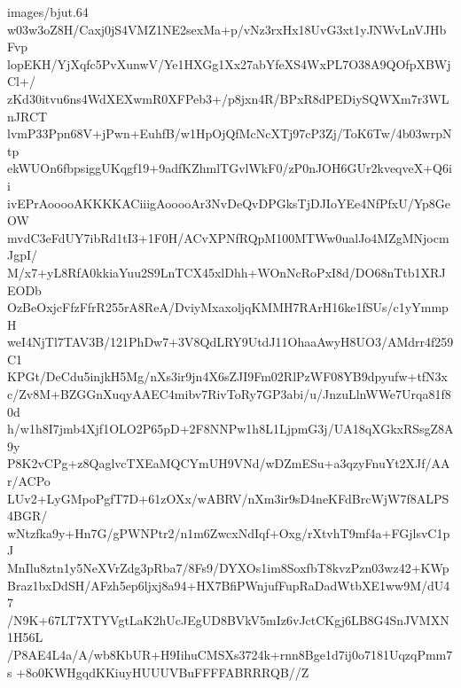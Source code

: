 \begin{filecontents*}{images/bjut.64}
w03w3oZ8H/Caxj0jS4VMZ1NE2sexMa+p/vNz3rxHx18UvG3xt1yJNWvLnVJHbFvp
lopEKH/YjXqfc5PvXunwV/Ye1HXGg1Xx27abYfeXS4WxPL7O38A9QOfpXBWjCl+/
zKd30itvu6ns4WdXEXwmR0XFPeb3+/p8jxn4R/BPxR8dPEDiySQWXm7r3WLnJRCT
lvmP33Ppn68V+jPwn+EuhfB/w1HpOjQfMcNcXTj97cP3Zj/ToK6Tw/4b03wrpNtp
ekWUOn6fbpsiggUKqgf19+9adfKZhmlTGvlWkF0/zP0nJOH6GUr2kveqveX+Q6ii
ivEPrAooooAKKKKACiiigAooooAr3NvDeQvDPGksTjDJIoYEe4NfPfxU/Yp8GeOW
mvdC3eFdUY7ibRd1tI3+1F0H/ACvXPNfRQpM100MTWw0ualJo4MZgMNjocmJgpI/
M/x7+yL8RfA0kkiaYuu2S9LnTCX45xlDhh+WOnNcRoPxI8d/DO68nTtb1XRJEODb
OzBeOxjcFfzFfrR255rA8ReA/DviyMxaxoljqKMMH7RArH16ke1fSUs/c1yYmmpH
weI4NjTl7TAV3B/121PhDw7+3V8QdLRY9UtdJ11OhaaAwyH8UO3/AMdrr4f259C1
KPGt/DeCdu5injkH5Mg/nXs3ir9jn4X6sZJI9Fm02RlPzWF08YB9dpyufw+tfN3x
c/Zv8M+BZGGnXuqyAAEC4mibv7RivToRy7GP3abi/u/JnzuLlnWWe7Urqa81f80d
h/w1h8I7jmb4Xjf1OLO2P65pD+2F8NNPw1h8L1LjpmG3j/UA18qXGkxRSsgZ8A9y
P8K2vCPg+z8QaglvcTXEaMQCYmUH9VNd/wDZmESu+a3qzyFnuYt2XJf/AAr/ACPo
LUv2+LyGMpoPgfT7D+61zOXx/wABRV/nXm3ir9sD4neKFdBrcWjW7f8ALPS4BGR/
wNtzfka9y+Hn7G/gPWNPtr2/n1m6ZwcxNdIqf+Oxg/rXtvhT9mf4a+FGjlsvC1pJ
MnIlu8ztn1y5NeXVrZdg3pRba7/8Fs9/DYXOs1im8SoxfbT8kvzPzn03wz42+KWp
Braz1bxDdSH/AFzh5ep6ljxj8a94+HX7BfiPWnjufFupRaDadWtbXE1ww9M/dU47
/N9K+67LT7XTYVgtLaK2hUcJEgUD8BVkV5mIz6vJctCKgj6LB8G4SnJVMXN1H56L
/P8AE4L4a/A/wb8KbUR+H9IihuCMSXs3724k+rnn8Bge1d7ij0o7181UqzqPmm7s
+8o0KWHgqdKKiuyHUUUVBuFFFFABRRRQB//Z
\end{filecontents*}
